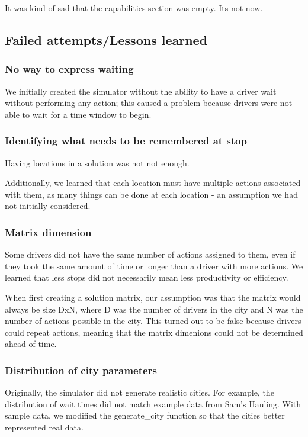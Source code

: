 \documentclass{article}
\begin{document}
It was kind of sad that the capabilities section was empty.
Its not now.


\subsection{Failed attempts/Lessons learned}


\subsubsection{No way to express waiting}

We initially created the simulator without the ability to have a driver wait without performing any action;
this caused a problem because drivers were not able to wait for a time window to begin.  


\subsubsection{Identifying what needs to be remembered at stop}
Having locations in a solution was not not enough.

Additionally, we learned that each location must have multiple actions associated with them, 
as many things can be done at each location - an assumption we had not initially considered.


\subsubsection{Matrix dimension}
Some drivers did not have the same number of actions assigned to them, even if they took the same amount of time or longer than a driver with more actions.
We learned that less stops did not necessarily mean less productivity or efficiency.

When first creating a solution matrix, our assumption was that the matrix would always be size DxN, where D was the number of drivers in the city and N was the number of actions possible in the city. 
This turned out to be false because drivers could repeat actions, meaning that the matrix dimenions could not be determined ahead of time.

\subsubsection{Distribution of city parameters}
Originally, the simulator did not generate realistic cities.
For example, the distribution of wait times did not match example data from Sam's Hauling.
With sample data, we modified the generate\_city function so that the cities better represented real data.
\end{document}
